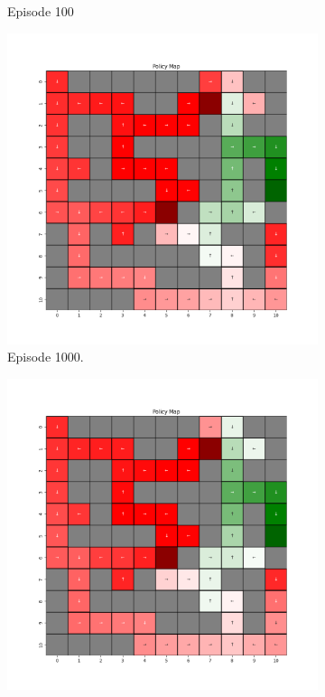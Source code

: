 \documentclass{assignment}
\begin{document}
\begin{figure}[H]
\begin{subfigure}{0.3\textwidth}
    \caption{Episode 100}
    \end{subfigure}
    \begin{subfigure}{0.3\textwidth}
        \includegraphics[width=\textwidth]{figures/policy_q/alpha_sweep/policy_alpha_0.5_gamma_0.95_epsilon_0.2_iteration_1000.png}
    \caption{Episode 1000.}
    \end{subfigure}\hfill
    \begin{subfigure}{0.3\textwidth}
        \includegraphics[width=\textwidth]{figures/policy_q/alpha_sweep/policy_alpha_0.5_gamma_0.95_epsilon_0.2_iteration_5000.png}

\end{subfigure}
\end{figure}
\end{document}
